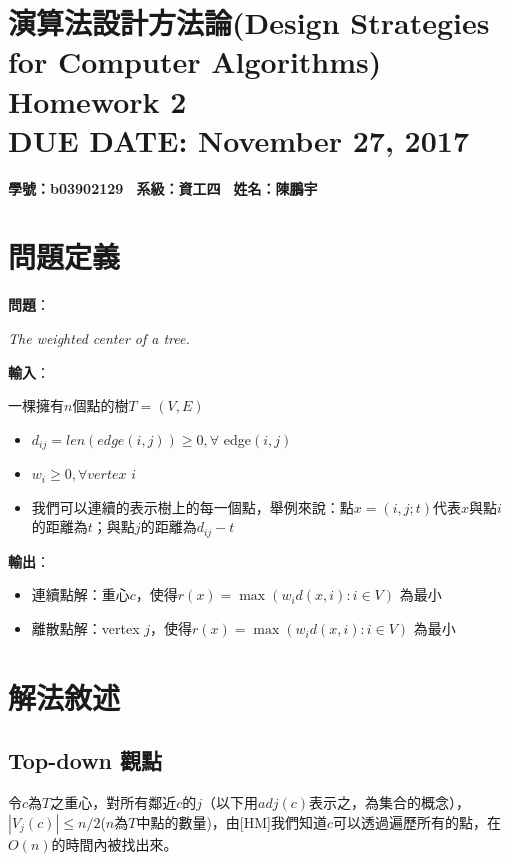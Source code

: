 \documentclass[15pt]{extarticle}
\newcommand{\hmwkClass}{演算法設計方法論(Design Strategies for Computer Algorithms)}
\newcommand{\hmwkTitle}{Homework 2}
\newcommand{\hmwkDueDate}{November 27, 2017}
\begin{document}
\thispagestyle{empty}
\section*{\hmwkClass \\
    \normalsize{\hmwkTitle} \\
    \normalsize{DUE DATE: \hmwkDueDate}
}

\hfill \textbf{學號：b03902129 \, 系級：資工四 \, 姓名：陳鵬宇} \\

\section{問題定義}
\textbf{問題}：\begin{minipage}[t]{0.8\linewidth}
    \textit{The weighted center of a tree.} \vskip0mm
\end{minipage}

\vskip3mm
\textbf{輸入}：
\begin{minipage}[t]{0.8\linewidth}
    一棵擁有$n$個點的樹$T=(V,E)$
    \begin{itemize}
        \item $d_{ij} = len(edge(i,j))\ge0,\forall$ edge$(i,j)$
        \item $w_i\ge0,\forall vertex$ $i$ 
        \item 我們可以連續的表示樹上的每一個點，舉例來說：點$x=(i,j;t)$代表$x$與點$i$的距離為$t$；與點$j$的距離為$d_{ij}-t$
    \end{itemize}
\end{minipage}

\vskip3mm
\textbf{輸出}：
\begin{minipage}[t]{0.8\linewidth}
\begin{itemize}
    \item 連續點解：重心$c$，使得$r(x)=\max(w_i d(x,i):i\in V)$ 為最小
    \item 離散點解：vertex $j$，使得$r(x)=\max(w_i d(x,i):i\in V)$ 為最小
\end{itemize}
\end{minipage}

\section{解法敘述}

\subsection{Top-down 觀點}
令$c$為$T$之重心，對所有鄰近$c$的$j$（以下用$adj(c)$表示之，為集合的概念），$|V_j(c)|\le n/2$($n$為$T$中點的數量)，由[HM]我們知道$c$可以透過遍歷所有的點，在$O(n)$的時間內被找出來。\\
\end{document}
